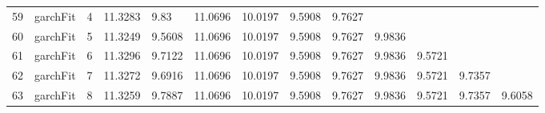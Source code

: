 \documentclass[10pt,a4paper]{article}
\begin{document}
\begin{table}[ht]
\begin{tabular}{rlrllllllllll}
  59 & garchFit &     4 & 11.3283 & 9.83 & 11.0696 & 10.0197 & 9.5908 & 9.7627 &  &  &  &  \\ 
  60 & garchFit &     5 & 11.3249 & 9.5608 & 11.0696 & 10.0197 & 9.5908 & 9.7627 & 9.9836 &  &  &  \\ 
  61 & garchFit &     6 & 11.3296 & 9.7122 & 11.0696 & 10.0197 & 9.5908 & 9.7627 & 9.9836 & 9.5721 &  &  \\ 
  62 & garchFit &     7 & 11.3272 & 9.6916 & 11.0696 & 10.0197 & 9.5908 & 9.7627 & 9.9836 & 9.5721 & 9.7357 &  \\ 
  63 & garchFit &     8 & 11.3259 & 9.7887 & 11.0696 & 10.0197 & 9.5908 & 9.7627 & 9.9836 & 9.5721 & 9.7357 & 9.6058 \\ 
   \hline
\end{tabular}
\end{table}
\end{document}
